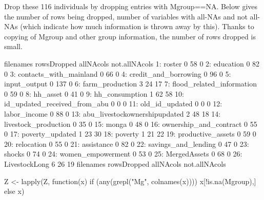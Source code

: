 Drop these 116 individuals by dropping entries with \textsf{Mgroup}==NA. Below gives the number of rows being dropped, number of variables with all-NAs and not all-NAs (which indicate how much information is thrown away by this). Thanks to copying of \textsf{Mgroup} and other group information, the number of rows dropped is small.
\begin{Schunk}
\begin{Soutput}
                        filenames rowsDropped allNAcols not.allNAcols
 1:                        roster           0        58             0
 2:                     education           0        82             0
 3:        contacts_with_mainland           0        66             0
 4:          credit_and_borrowing           0        96             0
 5:                  input_output           0       137             0
 6:               farm_production           3        24            17
 7:     flood_related_information           0        59             0
 8:                      hh_asset           0        41             0
 9:                hh_consumption           1        62            58
10:  id_updated_received_from_abu           0         0             0
11:                old_id_updated           0         0             0
12:                  labor_income           0        88             0
13: abu_livestockownershipupdated           2        48            18
14:          livestock_production           0        35             0
15:                         monga           0        48             0
16:        ownership_and_contract           0        55             0
17:               poverty_updated           1        23            30
18:                       poverty           1        21            22
19:             productive_assets           0        59             0
20:                    relocation           0        55             0
21:                    assistance           0        82             0
22:           savings_and_lending           0        47             0
23:                        shocks           0        74             0
24:             women_empowerment           0        53             0
25:                  MergedAssets           0        68             0
26:                 LivestockLong           6        26            19
                        filenames rowsDropped allNAcols not.allNAcols
\end{Soutput}
\end{Schunk}
\begin{Schunk}
\begin{Sinput}
Z <- lapply(Z, function(x) 
	if (any(grepl("Mg", colnames(x)))) x[!is.na(Mgroup),] else x)
\end{Sinput}
\end{Schunk}

